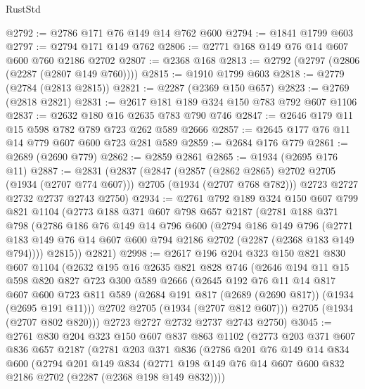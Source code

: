 \begin{lexlean}{RustStd}
\begin{coremodule}
@2792 := @2786 @171 @76 @149 @14 @762 @600
@2794 := @1841 @1799 @603
@2797 := @2794 @171 @149 @762
@2806 := @2771 @168 @149 @76 @14 @607 @600 @760 @2186 @2702
@2807 := @2368 @168
@2813 := @2792 (@2797 (@2806 (@2287 (@2807 @149 @760))))
@2815 := @1910 @1799 @603
@2818 := @2779 (@2784 (@2813 @2815))
@2821 := @2287 (@2369 @150 @657)
@2823 := @2769 (@2818 @2821)
@2831 := @2617 @181 @189 @324 @150 @783 @792 @607 @1106
@2837 := @2632 @180 @16 @2635 @783 @790 @746
@2847 := @2646 @179 @11 @15 @598 @782 @789 @723 @262 @589 @2666
@2857 := @2645 @177 @76 @11 @14 @779 @607 @600 @723 @281 @589
@2859 := @2684 @176 @779
@2861 := @2689 (@2690 @779)
@2862 := @2859 @2861
@2865 := @1934 (@2695 @176 @11)
@2887 := @2831
    (@2837
      (@2847
        (@2857 (@2862 @2865) @2702 @2705 (@1934 (@2707 @774 @607)))
        @2705
        (@1934 (@2707 @768 @782)))
      @2723
      @2727
      @2732
      @2737
      @2743
      @2750)
@2934 := @2761
    @792
    @189
    @324
    @150
    @607
    @799
    @821
    @1104
    (@2773
      @188
      @371
      @607
      @798
      @657
      @2187
      (@2781
        @188
        @371
        @798
        (@2786
          @186
          @76
          @149
          @14
          @796
          @600
          (@2794
            @186
            @149
            @796
            (@2771 @183 @149 @76 @14 @607 @600 @794 @2186 @2702 (@2287 (@2368 @183 @149 @794))))
          @2815))
      @2821)
@2998 := @2617
    @196
    @204
    @323
    @150
    @821
    @830
    @607
    @1104
    (@2632
      @195
      @16
      @2635
      @821
      @828
      @746
      (@2646
        @194
        @11
        @15
        @598
        @820
        @827
        @723
        @300
        @589
        @2666
        (@2645
          @192
          @76
          @11
          @14
          @817
          @607
          @600
          @723
          @811
          @589
          (@2684 @191 @817 (@2689 (@2690 @817)) (@1934 (@2695 @191 @11)))
          @2702
          @2705
          (@1934 (@2707 @812 @607)))
        @2705
        (@1934 (@2707 @802 @820)))
      @2723
      @2727
      @2732
      @2737
      @2743
      @2750)
@3045 := @2761
    @830
    @204
    @323
    @150
    @607
    @837
    @863
    @1102
    (@2773
      @203
      @371
      @607
      @836
      @657
      @2187
      (@2781
        @203
        @371
        @836
        (@2786
          @201
          @76
          @149
          @14
          @834
          @600
          (@2794
            @201
            @149
            @834
            (@2771 @198 @149 @76 @14 @607 @600 @832 @2186 @2702 (@2287 (@2368 @198 @149 @832))))

\end{coremodule}
\end{lexlean}
